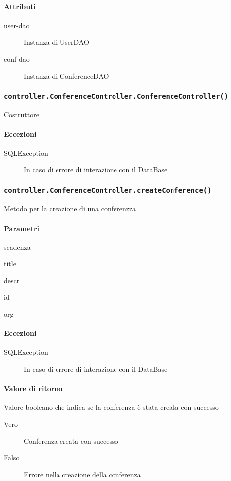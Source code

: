 \paragraph{Attributi}
\begin{description}
\item[user-dao] Instanza di  UserDAO
\item[conf-dao] Instanza di ConferenceDAO
\end{description}

\subsubsection{\texttt{controller.ConferenceController.ConferenceController()}}
Costruttore
\paragraph{Eccezioni}
\begin{description}
\item[SQLException] In caso di errore di interazione con il DataBase
\end{description}

\subsubsection{\texttt{controller.ConferenceController.createConference()}}
Metodo per la creazione di una conferenzza
\paragraph{Parametri}
\begin{description}
\item scadenza
\item title
\item descr
\item id
\item org
\end{description}
\paragraph{Eccezioni}
\begin{description}
\item[SQLException] In caso di errore di interazione con il DataBase
\end{description}
\paragraph{Valore di ritorno}
Valore booleano che indica se la conferenza è stata creata con successo
\begin{description}
\item [Vero] Conferenza creata con successo
\item [Falso] Errore nella creazione della conferenza
\end{description}

